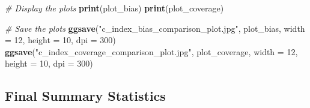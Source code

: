 \documentclass[
  letterpaper,
  DIV=11,
  numbers=noendperiod]{scrartcl}
\newenvironment{Shaded}{\begin{snugshade}}{\end{snugshade}}
\newcommand{\AttributeTok}[1]{\textcolor[rgb]{0.13,0.29,0.53}{#1}}
\newcommand{\CommentTok}[1]{\textcolor[rgb]{0.56,0.35,0.01}{\textit{#1}}}
\newcommand{\DecValTok}[1]{\textcolor[rgb]{0.00,0.00,0.81}{#1}}
\newcommand{\FunctionTok}[1]{\textcolor[rgb]{0.13,0.29,0.53}{\textbf{#1}}}
\newcommand{\NormalTok}[1]{#1}
\newcommand{\StringTok}[1]{\textcolor[rgb]{0.31,0.60,0.02}{#1}}
\begin{document}
\begin{Shaded}
\begin{Highlighting}[]
\CommentTok{\# Display the plots}
\FunctionTok{print}\NormalTok{(plot\_bias)}
\FunctionTok{print}\NormalTok{(plot\_coverage)}

\CommentTok{\# Save the plots}
\FunctionTok{ggsave}\NormalTok{(}\StringTok{"c\_index\_bias\_comparison\_plot.jpg"}\NormalTok{, plot\_bias, }\AttributeTok{width =} \DecValTok{12}\NormalTok{, }\AttributeTok{height =} \DecValTok{10}\NormalTok{, }\AttributeTok{dpi =} \DecValTok{300}\NormalTok{)}
\FunctionTok{ggsave}\NormalTok{(}\StringTok{"c\_index\_coverage\_comparison\_plot.jpg"}\NormalTok{, plot\_coverage, }\AttributeTok{width =} \DecValTok{12}\NormalTok{, }\AttributeTok{height =} \DecValTok{10}\NormalTok{, }\AttributeTok{dpi =} \DecValTok{300}\NormalTok{)}
\end{Highlighting}
\end{Shaded}

\subsection{Final Summary Statistics}\label{final-summary-statistics}
\end{document}
